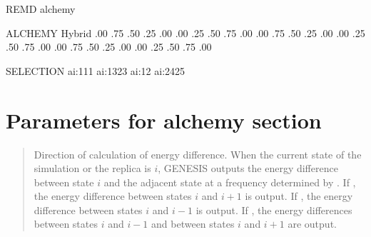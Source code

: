 \documentclass[a4paper,11pt,oneside,english]{sphinxmanual}
\begin{document}
\begin{sphinxVerbatim}[commandchars=\\\{\}]
\PYG{o}{[}REMD\PYG{o}{]}
        
  
            alchemy
        

\PYG{o}{[}ALCHEMY\PYG{o}{]}
  Hybrid
         
         
           
           
       .00 .75 .50 .25 .00
       .00 .25 .50 .75 .00
       .00 .75 .50 .25 .00
       .00 .25 .50 .75 .00
     .00 .75 .50 .25 .00
     .00 .25 .50 .75 .00

\PYG{o}{[}SELECTION\PYG{o}{]}
        ai:1\PYGZhy{}11   
        ai:13\PYGZhy{}23  
        ai:12     
        ai:24\PYGZhy{}25  
\end{sphinxVerbatim}


\section{Parameters for alchemy section}
\label{\detokenize{20_Alchemy:parameters-for-alchemy-section}}
 
\begin{quote}


Direction of calculation of energy difference.
When the current state of the simulation or the replica is \(i\),
GENESIS outputs the energy difference between state \(i\) and the adjacent state at a frequency determined by .
If , the energy difference between states \(i\) and \(i+1\) is output.
If , the energy difference between states \(i\) and \(i-1\) is output.
If , the energy differences between states \(i\) and \(i-1\) and between states \(i\) and \(i+1\) are output.
\end{quote}
\end{document}
